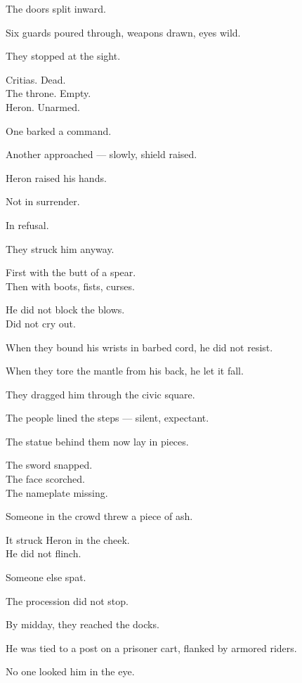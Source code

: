 \documentclass[12pt]{article}
\begin{document}
The doors split inward.

Six guards poured through, weapons drawn, eyes wild.

They stopped at the sight.

Critias. Dead.\\
The throne. Empty.\\
Heron. Unarmed.

One barked a command.

Another approached — slowly, shield raised.

Heron raised his hands.

Not in surrender.

In refusal.

\vspace{1em}

They struck him anyway.

First with the butt of a spear.\\
Then with boots, fists, curses.

He did not block the blows.\\
Did not cry out.

When they bound his wrists in barbed cord, he did not resist.

When they tore the mantle from his back, he let it fall.

\vspace{1em}

They dragged him through the civic square.

The people lined the steps — silent, expectant.

The statue behind them now lay in pieces.

The sword snapped.\\
The face scorched.\\
The nameplate missing.

Someone in the crowd threw a piece of ash.

It struck Heron in the cheek.\\
He did not flinch.

Someone else spat.

The procession did not stop.

\vspace{1em}

By midday, they reached the docks.

He was tied to a post on a prisoner cart, flanked by armored riders.

No one looked him in the eye.

\vspace{1em}
\end{document}
